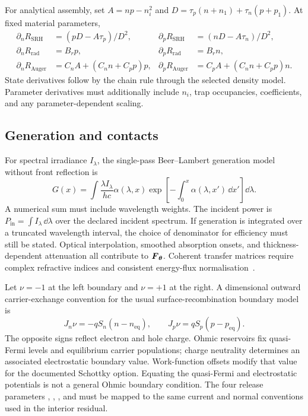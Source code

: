 \documentclass[11pt,a4paper]{article}
\numberwithin{equation}{section}
\begin{document}
For analytical assembly, set $A=np-n_i^2$ and
$D=\tau_p(n+n_1)+\tau_n(p+p_1)$. At fixed material parameters,
\begin{align}
\partial_nR_{\mathrm{SRH}}&=(pD-A\tau_p)/D^2,&
\partial_pR_{\mathrm{SRH}}&=(nD-A\tau_n)/D^2,\\
\partial_nR_{\mathrm{rad}}&=B_rp,&
\partial_pR_{\mathrm{rad}}&=B_rn,\\
\partial_nR_{\mathrm{Auger}}&=C_nA+(C_nn+C_pp)p,&
\partial_pR_{\mathrm{Auger}}&=C_pA+(C_nn+C_pp)n.
\end{align}
State derivatives follow by the chain rule through the selected density
model. Parameter derivatives must additionally include $n_i$, trap
occupancies, coefficients, and any parameter-dependent scaling.

\subsection{Generation and contacts}
For spectral irradiance $I_\lambda$, the single-pass Beer--Lambert
generation model without front reflection is~\cite{mann2022partial}
\begin{equation}
G(x)=\int\frac{\lambda I_\lambda}{hc}\alpha(\lambda,x)
\exp\left[-\int_0^x\alpha(\lambda,x')\,\dd x'\right]\dd\lambda.
\end{equation}
A numerical sum must include wavelength weights. The incident power is
$P_{\mathrm{in}}=\int I_\lambda\,\dd\lambda$ over the declared incident
spectrum. If generation is integrated over a truncated wavelength
interval, the choice of denominator for efficiency must still be stated.
Optical interpolation, smoothed absorption onsets, and thickness-dependent
attenuation all contribute to $\boldsymbol{F}_{\boldsymbol{\theta}}$.
Coherent transfer matrices require complex refractive indices and
consistent energy-flux normalisation~\cite{byrnes2016}.

Let $\nu=-1$ at the left boundary and $\nu=+1$ at the right. A
dimensional outward carrier-exchange convention for the usual
surface-recombination boundary model~\cite{gaury2019,mann2022partial} is
\begin{equation}
J_n\nu=-qS_n(n-n_{\mathrm{eq}}),\qquad
J_p\nu= qS_p(p-p_{\mathrm{eq}}).
\end{equation}
The opposite signs reflect electron and hole charge. Ohmic reservoirs
fix quasi-Fermi levels and equilibrium carrier populations; charge
neutrality determines an associated electrostatic boundary value.
Work-function offsets modify that value for the documented Schottky
option. Equating the quasi-Fermi and electrostatic potentials is not a
general Ohmic boundary condition. The four release parameters
, , , and  must be mapped to the
same current and normal conventions used in the interior residual.
\end{document}
